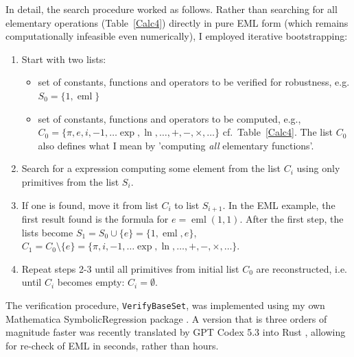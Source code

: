 \documentclass[12pt]{article}
\DeclareMathOperator{\eml}{eml}
\begin{document}
In detail, the search procedure worked as follows. Rather than searching for all elementary operations (Table~\ref{Calc4}) directly in pure EML form (which remains computationally infeasible even numerically), I employed iterative bootstrapping:
\begin{enumerate}
\item Start with two lists: 
    \begin{itemize}
        \item set of constants, functions and operators to be verified for robustness, e.g. $S_0=\{1, \eml \}$
        \item set of constants, functions and operators to be computed, e.g., $C_0=\{\pi, e, i, -1, \ldots \exp, \ln, \ldots, +, -, \times, \ldots \}$ cf.~Table~\ref{Calc4}. The list $C_0$ also defines what I mean by 'computing \emph{all} elementary functions'.
    \end{itemize}
\item Search for a expression computing some element from the list $C_i$ using only primitives from the list $S_i$.
\item If one is found, move it from list $C_i$ to list $S_{i+1}$. In the EML example, the first result found is the formula for $e=\eml(1,1)$.
After the first step, the lists become $S_1 = S_0 \cup \{e\} = \{1, \eml, e \}$, $C_1= C_0 \setminus \{e\} = \{\pi, i, -1, \ldots \exp, \ln, \ldots, +, -, \times, \ldots \}$.  
\item Repeat steps 2-3 until all primitives from initial list $C_0$ are reconstructed, i.e. until $C_i$ becomes empty: $C_i= \emptyset$.
\end{enumerate}
The verification procedure, \texttt{VerifyBaseSet}, was implemented using my own Mathematica SymbolicRegression package \cite{SymbolicRegressionPackage}. A version that is three orders of magnitude faster was recently translated by GPT Codex 5.3 into Rust \cite{SymbolicRegressionPackage}, allowing for re-check of EML in seconds, rather than hours. 
\end{document}
